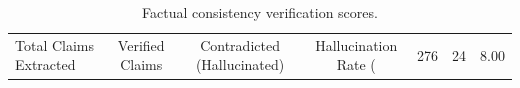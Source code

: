 \begin{table}[htbp]
  \centering
  \caption{Factual consistency verification scores.}
  \label{tab:hallucination_study}
  \begin{tabular}{lcccc}
    \toprule
    Total Claims Extracted & Verified Claims & Contradicted (Hallucinated) & Hallucination Rate (%
     & 276 & 24 & 8.00%
    \bottomrule
  \end{tabular}
\end{table}